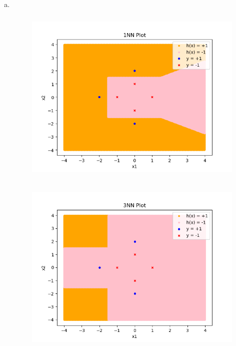 \documentclass[11pt]{article}
\begin{document}
\begin{enumerate} [(a)]
	\item \ \begin{figure}[htb] 
			{\includegraphics[height=8.5cm]{p6_1_a_1.png}}
	\end{figure}
	\begin{figure}[htb] 
			{\includegraphics[height=8.5cm]{p6_1_a_3.png}}
	\end{figure}

	\newpage


\end{enumerate}
\end{document}
